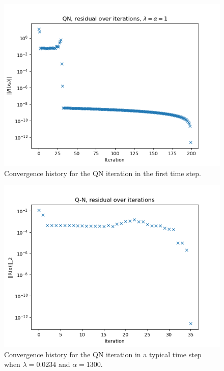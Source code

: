 \documentclass[]{article}
\begin{document}
\begin{figure}
	\includegraphics[width=0.9\linewidth]{qn_1.png}
	\caption{\label{qn} Convergence history for the QN iteration in the first time step.}
\end{figure}

\begin{figure}
	\includegraphics[width=0.9\linewidth]{qn.png}
	\caption{\label{qn} Convergence history for the QN iteration in a typical time step when $\lambda=0.0234$ and $\alpha=1300$.}
\end{figure}
\end{document}
